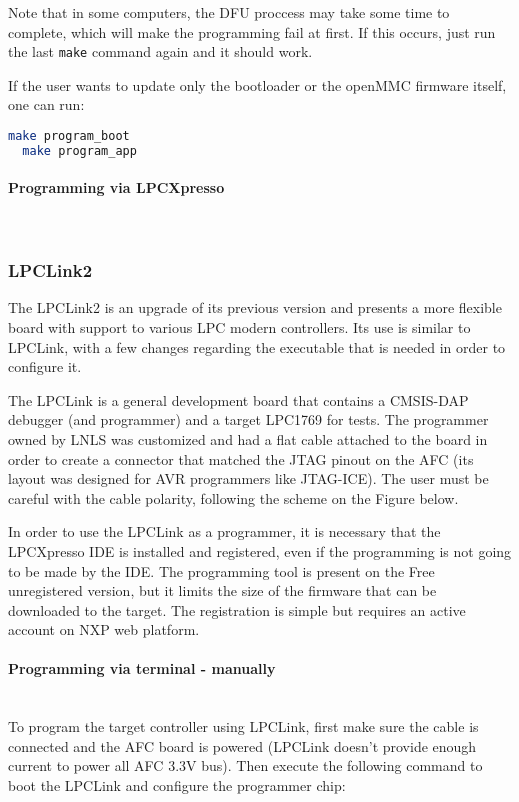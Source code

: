 \documentclass[letterpaper,12pt, titlepage]{article}
\newcommand{\newparagraph}[1]{\paragraph{#1}\mbox{}\\}
\begin{document}
Note that in some computers, the DFU proccess may take some time to complete, which will make the programming fail at first. If this occurs, just run the last \texttt{make} command again and it should work.

If the user wants to update only the bootloader or the openMMC firmware itself, one can run:

\begin{lstlisting}[language=bash]
  make program_boot
  make program_app
\end{lstlisting}


\newparagraph{Programming via LPCXpresso}


\subsubsection{LPCLink2}
The LPCLink2 is an upgrade of its previous version and presents a more flexible board with support to various LPC modern controllers. Its use is similar to LPCLink, with a few changes regarding the executable that is needed in order to configure it.

The LPCLink is a general development board that contains a CMSIS-DAP debugger (and programmer) and a target LPC1769 for tests. The programmer owned by LNLS was customized and had a flat cable attached to the board in order to create a connector that matched the JTAG pinout on the AFC (its layout was designed for AVR programmers like JTAG-ICE).
The user must be careful with the cable polarity, following the scheme on the Figure below.


In order to use the LPCLink as a programmer, it is necessary that the LPCXpresso IDE is installed and registered, even if the programming is not going to be made by the IDE. The programming tool is present on the Free unregistered version, but it limits the size of the firmware that can be downloaded to the target. The registration is simple but requires an active account on NXP web platform.


\newparagraph{Programming via terminal - manually}
To program the target controller using LPCLink, first make sure the cable is connected and the AFC board is powered (LPCLink doesn't provide enough current to power all AFC 3.3V bus). Then execute the following command to boot the LPCLink and configure the programmer chip:
\end{document}
